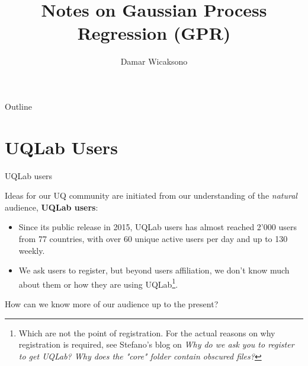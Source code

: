 \documentclass[]{rsuqbeamernew}
\title[Notes on GPR]{Notes on Gaussian Process Regression (GPR)}
\author[D. Wicaksono]{Damar Wicaksono}
\institute[RSUQ, ETH Z\"urich]{Chair of Risk, Safety and Uncertainty 
Quantification -- ETH Z\"urich}
\date[28.03.2019]
\begin{document}
\begin{frame}{Outline}


\tableofcontents

\end{frame}

\section{UQLab Users}

\begin{frame}{UQLab users}

Ideas for our UQ community are initiated
from our understanding of the \emph{natural} audience, \textbf{UQLab users}: 

\begin{itemize}
  \item Since its public release in 2015, UQLab users has almost reached 2'000 users from 77 countries,
  with over 60 unique active users per day and up to 130 weekly.
  \item We ask users to register, but beyond users affiliation,
  we don't know much about them or how they are using UQLab\footnote{Which are not the point of registration. For the actual reasons on why registration is required, see Stefano's blog on \emph{Why do we ask you to register to get UQLab? Why does the "core" folder contain obscured files?}}.
\end{itemize}

How can we know more of our audience up to the present?
    
\end{frame}
\end{document}
